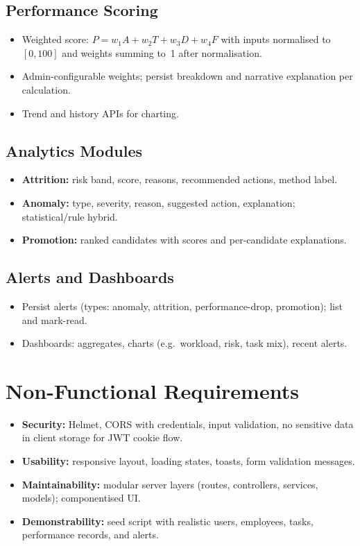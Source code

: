 \subsection{Performance Scoring}
\begin{itemize}
  \item Weighted score: $P = w_1 A + w_2 T + w_3 D + w_4 F$ with inputs normalised to $[0,100]$ and weights summing to~1 after normalisation.
  \item Admin-configurable weights; persist breakdown and narrative explanation per calculation.
  \item Trend and history APIs for charting.
\end{itemize}

\subsection{Analytics Modules}
\begin{itemize}
  \item \textbf{Attrition:} risk band, score, reasons, recommended actions, method label.
  \item \textbf{Anomaly:} type, severity, reason, suggested action, explanation; statistical/rule hybrid.
  \item \textbf{Promotion:} ranked candidates with scores and per-candidate explanations.
\end{itemize}

\subsection{Alerts and Dashboards}
\begin{itemize}
  \item Persist alerts (types: anomaly, attrition, performance-drop, promotion); list and mark-read.
  \item Dashboards: aggregates, charts (e.g.\ workload, risk, task mix), recent alerts.
\end{itemize}

\section{Non-Functional Requirements}
\begin{itemize}
  \item \textbf{Security:} Helmet, CORS with credentials, input validation, no sensitive data in client storage for JWT cookie flow.
  \item \textbf{Usability:} responsive layout, loading states, toasts, form validation messages.
  \item \textbf{Maintainability:} modular server layers (routes, controllers, services, models); componentised UI.
  \item \textbf{Demonstrability:} seed script with realistic users, employees, tasks, performance records, and alerts.
\end{itemize}

